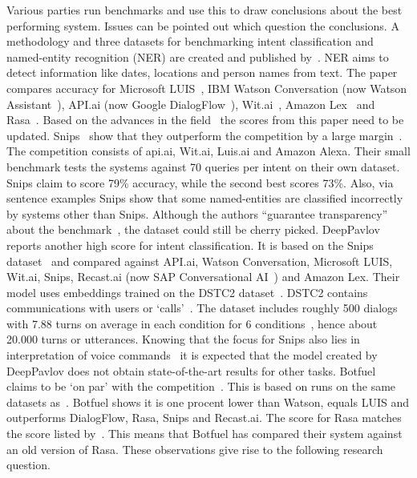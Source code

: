 Various parties run benchmarks and use this to draw conclusions about the best performing system.
Issues can be pointed out which question the conclusions.
A methodology and three datasets for benchmarking intent classification and named-entity recognition (NER) are created and published by~\citet{braun2017}.
NER aims to detect information like dates, locations and person names from text.
The paper compares accuracy for Microsoft LUIS~\citep{microsoft2019luis}, IBM Watson Conversation (now Watson Assistant~\citep{ibm2019assistant}), API.ai (now Google DialogFlow~\citep{google2019dialogflow}), Wit.ai~\citep{facebook2019wit}, Amazon Lex~\citep{amazon2019lex} and Rasa~\citep{bocklisch2017rasa}.
Based on the advances in the field~\citep{young2018recent} the scores from this paper need to be updated.
Snips~\citep{snips2019voice} show that they outperform the competition by a large margin~\citep{snips2017benchmarking}.
The competition consists of api.ai, Wit.ai, Luis.ai and Amazon Alexa.
Their small benchmark tests the systems against 70 queries per intent on their own dataset.
Snips claim to score 79\% accuracy, while the second best scores 73\%.
Also, via sentence examples Snips show that some named-entities are classified incorrectly by systems other than Snips.
Although the authors ``guarantee transparency'' about the benchmark~\citep{snips2017dataset}, the dataset could still be cherry picked.
DeepPavlov~\citep{burtsev2018} reports another high score for intent classification.
It is based on the Snips dataset~\citep{snips2017dataset} and compared against API.ai, Watson Conversation, Microsoft LUIS, Wit.ai, Snips, Recast.ai (now SAP Conversational AI~\citep{sap2019conversational}) and Amazon Lex.
Their model uses embeddings trained on the DSTC2 dataset~\citep{baymurzina2019classifiers,baymurzina2019intents}.
DSTC2 contains communications with users or `calls'~\citep{henderson2014second}.
The dataset includes roughly 500 dialogs with 7.88 turns on average in each condition for 6 conditions~\citep{henderson2014second}, hence about 20.000 turns or utterances.
Knowing that the focus for Snips also lies in interpretation of voice commands~\citep{snips2019voice} it is expected that the model created by DeepPavlov does not obtain state-of-the-art results for other tasks.
Botfuel~\citep{botfuel2019} claims to be `on par' with the competition~\citep{botfuel2018benchmark}.
This is based on runs on the same datasets as~\citet{braun2017}.
Botfuel shows it is one procent lower than Watson, equals LUIS and outperforms DialogFlow, Rasa, Snips and Recast.ai.
The score for Rasa matches the score listed by~\citet{braun2017}.
This means that Botfuel has compared their system against an old version of Rasa.
These observations give rise to the following research question.\\

